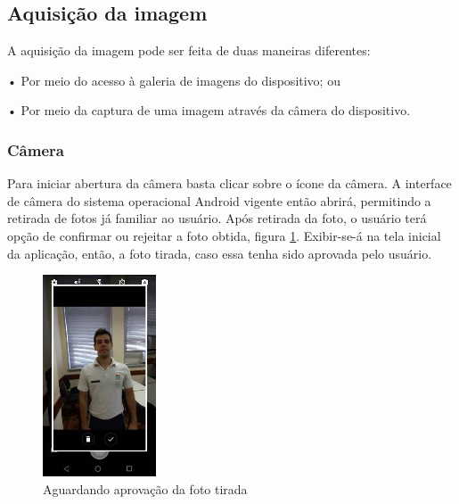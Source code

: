\subsection{Aquisição da imagem}
A aquisição da imagem pode ser feita de duas maneiras diferentes:

• Por meio do acesso à galeria de imagens do dispositivo; ou

• Por meio da captura de uma imagem através da câmera do dispositivo.

\subsubsection{Câmera}
Para iniciar abertura da câmera basta clicar sobre o ícone da câmera. A interface de câmera do sistema operacional Android vigente então abrirá, permitindo a retirada de fotos já familiar ao usuário. Após retirada da foto, o usuário terá opção de confirmar ou rejeitar a foto obtida, figura \ref{fig:figura59b}. Exibir-se-á na tela inicial da aplicação, então, a foto tirada, caso essa tenha sido aprovada pelo usuário.


\begin{figure}[!ht]
	\centering
\includegraphics[width=0.3\textwidth]{img/camera_2.jpeg}   
	\caption{Aguardando aprovação da foto tirada}
	\label{fig:figura59b}
\end{figure}


